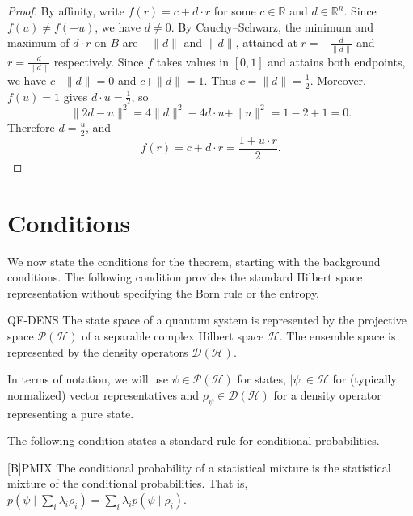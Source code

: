 \documentclass{techbrief}
\begin{document}
\begin{proof}
	By affinity, write $f(r)=c+d\cdot r$ for some $c \in \mathbb{R}$ and $d \in \mathbb{R}^n$. Since $f(u)\neq f(-u)$, we have $d\neq0$. By Cauchy--Schwarz, the minimum and maximum of $d\cdot r$ on $B$ are $-\|d\|$ and $\|d\|$, attained at $r=-\frac{d}{\|d\|}$ and $r=\frac{d}{\|d\|}$ respectively. Since $f$ takes values in $[0,1]$ and attains both endpoints, we have $c-\|d\|=0$ and $c+\|d\|=1$. Thus $c=\|d\|=\frac{1}{2}$. Moreover, $f(u)=1$ gives $d\cdot u=\frac{1}{2}$, so
	\begin{equation*}
		\|2d-u\|^2
		=4\|d\|^2-4d\cdot u+\|u\|^2
		=1-2+1=0.
	\end{equation*}
	Therefore $d=\frac{u}{2}$, and
	\begin{equation*}
		f(r)=c+d\cdot r=\frac{1+u\cdot r}{2}.
	\end{equation*}
\end{proof}

\section{Conditions}

We now state the conditions for the theorem, starting with the background conditions. The following condition provides the standard Hilbert space representation without specifying the Born rule or the entropy.

\begin{condition}{QE-DENS}
	The state space of a quantum system is represented by the projective space $\mathcal{P}(\mathcal{H})$ of a separable complex Hilbert space $\mathcal{H}$. The ensemble space is represented by the density operators $\mathcal{D}(\mathcal{H})$.
\end{condition}
In terms of notation, we will use $\psi \in \mathcal{P}(\mathcal{H})$ for states, $|\psi\> \in \mathcal{H}$ for (typically normalized) vector representatives and $\rho_{\psi} \in \mathcal{D}(\mathcal{H})$ for a density operator representing a pure state.

The following condition states a standard rule for conditional probabilities.

\begin{condition}{[B]PMIX}
	The conditional probability of a statistical mixture is the statistical mixture of the conditional probabilities. That is,
	$p(\psi\mid\sum_i \lambda_i\rho_i)=\sum_i \lambda_i p(\psi\mid\rho_i)$.
\end{condition}
\end{document}
